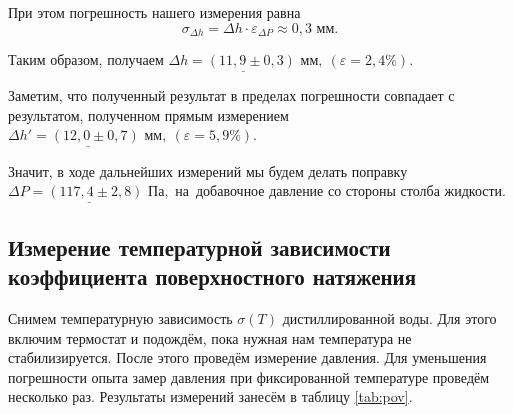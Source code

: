 \documentclass[a4paper,12pt]{article} %
\begin{document}
\medskip

При этом погрешность нашего измерения равна \[ \sigma_{\Delta h} = \Delta h \cdot \varepsilon_{\Delta P} \approx 0,3 \text{ мм}. \]

Таким образом, получаем $ \underline{\Delta h = (11,9 \pm 0,3) \text{ мм}}, \: (\varepsilon = 2,4\%). $

\medskip

Заметим, что полученный результат в пределах погрешности совпадает с результатом, полученном прямым измерением $ \underline{\Delta h' = (12,0 \pm 0,7) \text{ мм},} \: (\varepsilon = 5,9\%). $

Значит, в ходе дальнейших измерений мы будем делать поправку \label{popravka} $  \underline{\Delta P = (117,4 \pm 2,8) \text{ Па},}$ на~добавочное давление со стороны столба жидкости.

\subsection{Измерение температурной зависимости коэффициента поверхностного натяжения}

Снимем температурную зависимость $ \sigma(T) $ дистиллированной воды. Для этого включим термостат и подождём, пока нужная нам температура не стабилизируется. После этого проведём измерение давления. Для уменьшения погрешности опыта замер давления  при фиксированной температуре проведём несколько раз. Результаты измерений занесём в таблицу \ref{tab:pov}.
\end{document}
